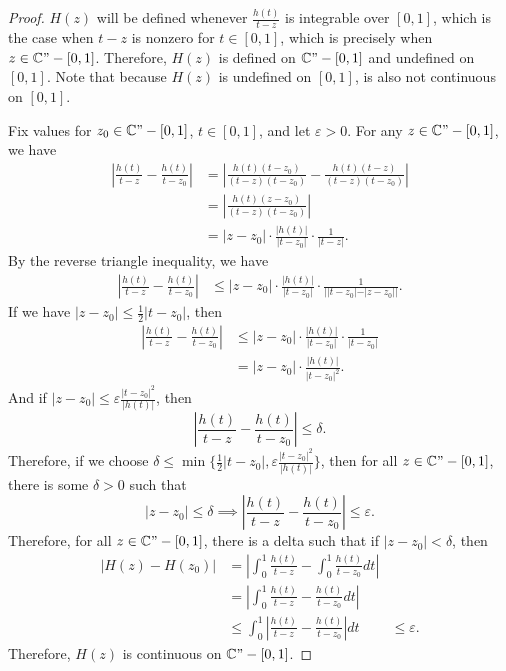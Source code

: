 \documentclass[12pt]{article}
\newcommand{\ds}{\displaystyle}
\newcommand{\C}{\mathbb{C}}
\let\eps\varepsilon
\begin{document}
\begin{proof}
    $H(z)$ will be defined whenever $\ds\frac{h(t)}{t-z}$ is integrable over $[0,1]$, which is the case when $t-z$ is nonzero for $t\in[0,1]$, which is precisely when $z\in\C"-[0,1]$. Therefore, $H(z)$ is defined on $\C"-[0,1]$ and undefined on $[0,1]$. Note that because $H(z)$ is undefined on $[0,1]$, is also not continuous on $[0,1]$.
    
    Fix values for $z_0\in\C"-[0,1]$, $t\in[0,1]$, and let $\eps>0$. For any $z\in\C"-[0,1]$, we have
    \begin{align*}
        \left|\frac{h(t)}{t-z} - \frac{h(t)}{t-z_0}\right| 
            &= \left|\frac{h(t)(t-z_0)}{(t-z)(t-z_0)} - \frac{h(t)(t-z)}{(t-z)(t-z_0)}\right| \\
            &= \left|\frac{h(t)(z-z_0)}{(t-z)(t-z_0)}\right| \\
            &= |z-z_0|\cdot\frac{|h(t)|}{|t-z_0|}\cdot\frac1{|t-z|}.
    \end{align*}
    By the reverse triangle inequality, we have
    \begin{align*}
        \left|\frac{h(t)}{t-z} - \frac{h(t)}{t-z_0}\right| 
            &\leq |z-z_0|\cdot\frac{|h(t)|}{|t-z_0|}\cdot\frac1{||t-z_0|-|z-z_0||}.
    \end{align*}
    If we have $|z-z_0|\leq\frac12|t-z_0|$, then
    \begin{align*}
        \left|\frac{h(t)}{t-z} - \frac{h(t)}{t-z_0}\right| 
            &\leq |z-z_0|\cdot\frac{|h(t)|}{|t-z_0|}\cdot\frac1{|t-z_0|} \\
            &= |z-z_0|\cdot\frac{|h(t)|}{|t-z_0|^2}.
    \end{align*}
    And if $|z-z_0|\leq \eps\frac{|t-z_0|^2}{|h(t)|}$, then
    \[\left|\frac{h(t)}{t-z} - \frac{h(t)}{t-z_0}\right| \leq \delta.\]
    Therefore, if we choose $\delta\leq\min\{\frac12|t-z_0|, \eps\frac{|t-z_0|^2}{|h(t)|}\}$, then for all $z\in\C"-[0,1]$, there is some $\delta>0$ such that
    \[|z-z_0| \leq \delta \implies \left|\frac{h(t)}{t-z} - \frac{h(t)}{t-z_0}\right| \leq \eps.\]
    Therefore, for all $z\in\C"-[0,1]$, there is a delta such that if $|z-z_0|<\delta$, then
    \begin{align*}
        |H(z)-H(z_0)|
            &= \left| \int_0^1\frac{h(t)}{t-z} - \int_0^1\frac{h(t)}{t-z_0} dt\right| \\
            &= \left| \int_0^1\frac{h(t)}{t-z} - \frac{h(t)}{t-z_0} dt\right| \\
            &\leq \int_0^1\left|\frac{h(t)}{t-z} - \frac{h(t)}{t-z_0}\right|dt
            &\leq \eps.
    \end{align*}
    Therefore, $H(z)$ is continuous on $\C"-[0,1]$.
    
\end{proof}
\end{document}
